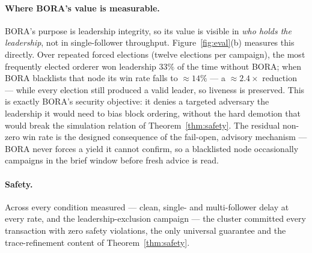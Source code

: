 \paragraph*{Where BORA's value is measurable.}
BORA's purpose is leadership integrity, so its value is visible in
\emph{who holds the leadership}, not in single-follower throughput.
Figure~\ref{fig:eval}(b) measures this directly. Over repeated
forced elections (twelve elections per campaign), the most
frequently elected orderer won leadership $33\%$ of the time
without BORA; when BORA blacklists that node its win rate falls to
$\approx 14\%$ --- a $\approx 2.4\times$ reduction --- while every
election still produced a valid leader, so liveness is preserved.
This is exactly BORA's security objective: it denies a targeted
adversary the leadership it would need to bias block ordering,
without the hard demotion that would break the simulation relation
of Theorem~\ref{thm:safety}. The residual non-zero win rate is the
designed consequence of the fail-open, advisory mechanism --- BORA
never forces a yield it cannot confirm, so a blacklisted node
occasionally campaigns in the brief window before fresh advice is
read.

\paragraph*{Safety.}
Across every condition measured --- clean, single- and
multi-follower delay at every rate, and the leadership-exclusion
campaign --- the cluster committed every transaction with zero
safety violations, the only universal guarantee and the
trace-refinement content of Theorem~\ref{thm:safety}.
